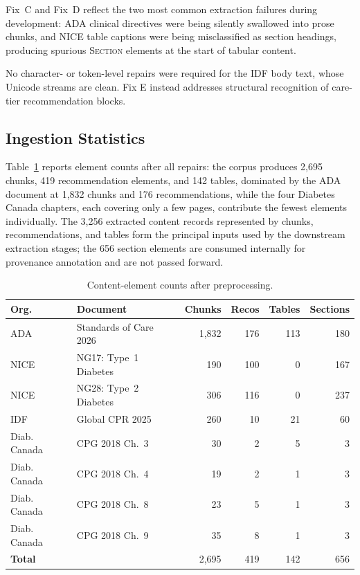 Fix~C and Fix~D reflect the two most common extraction failures during
development: ADA clinical directives were being silently swallowed into
prose chunks, and NICE table captions were being misclassified as section
headings, producing spurious \textsc{Section} elements at the start of
tabular content.

No character- or token-level repairs were required for the IDF body text, whose Unicode streams are clean. Fix E instead addresses structural recognition of care-tier recommendation blocks.

\subsection{Ingestion Statistics}
\label{sec:exp_ingestion-stats}

Table~\ref{tab:ingestion} reports element counts after all repairs: the corpus
produces 2,695 chunks, 419 recommendation elements, and 142 tables, dominated by
the ADA document at 1,832 chunks and 176 recommendations, while the four Diabetes
Canada chapters, each covering only a few pages, contribute the fewest elements
individually. The 3,256 extracted content records represented by chunks,
recommendations, and tables form the principal inputs used by the downstream
extraction stages; the 656 section elements are consumed internally for
provenance annotation and are not passed forward.

\begin{table}[!ht]
\centering
\small
\begin{tabular}{llrrrr}
\hline
\textbf{Org.} & \textbf{Document} & \textbf{Chunks}
              & \textbf{Recos} & \textbf{Tables} & \textbf{Sections} \\
\hline
ADA          & Standards of Care 2026   & 1{,}832 & 176 & 113 & 180 \\
NICE         & NG17: Type~1 Diabetes    &   190   & 100 &   0 & 167 \\
NICE         & NG28: Type~2 Diabetes    &   306   & 116 &   0 & 237 \\
IDF          & Global CPR 2025          &   260   &   10 &  21 &  60 \\
Diab. Canada & CPG 2018 Ch.~3           &    30   &  2 &  5 &   3 \\
Diab. Canada & CPG 2018 Ch.~4           &    19   &  2 &   1 &   3 \\
Diab. Canada & CPG 2018 Ch.~8           &    23   &  5 &   1 &   3 \\
Diab. Canada & CPG 2018 Ch.~9           &    35   &  8 &   1 &   3 \\
\hline
\textbf{Total} &                        & 2{,}695 & 419 & 142 & 656 \\
\hline
\end{tabular}
\caption{Content-element counts after preprocessing.}
\label{tab:ingestion}
\end{table}

